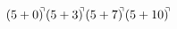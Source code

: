 \documentclass[preview]{standalone}
\begin{document}
\begin{align*}
(5+0)^{\hspace{-0.1cm}\urcorner} (5+3)^{\hspace{-0.1cm}\urcorner} (5+7)^{\hspace{-0.1cm}\urcorner} (5+10)^{\hspace{-0.1cm}\urcorner}
\end{align*}
\end{document}
